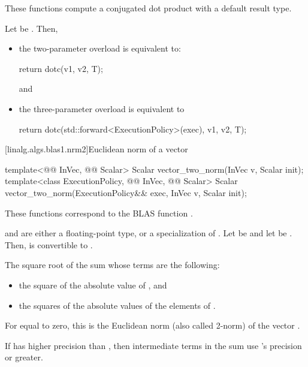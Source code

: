 \begin{itemdescr}

\pnum
These functions compute a conjugated dot product with a default result type.

\pnum
\effects
Let  be .
Then,
\begin{itemize}
\item
the two-parameter overload is equivalent to:
\begin{codeblock}
return dotc(v1, v2, T{});
\end{codeblock}
and
\item
the three-parameter overload is equivalent to
\begin{codeblock}
return dotc(std::forward<ExecutionPolicy>(exec), v1, v2, T{});
\end{codeblock}
\end{itemize}
\end{itemdescr}

[linalg.algs.blas1.nrm2]{Euclidean norm of a vector}

%
\begin{itemdecl}
template<@@ InVec, @@ Scalar>
  Scalar vector_two_norm(InVec v, Scalar init);
template<class ExecutionPolicy, @@ InVec, @@ Scalar>
  Scalar vector_two_norm(ExecutionPolicy&& exec, InVec v, Scalar init);
\end{itemdecl}

\begin{itemdescr}
\pnum
\begin{note}
These functions correspond to the BLAS function \supercite{blas1}.
\end{note}

\pnum
\mandates
{} and  are either a floating-point type, or
a specialization of .
Let  be
 and
let  be .
Then, 
is convertible to .

\pnum
\returns
The square root of the sum
whose terms are the following:
\begin{itemize}
\item
the square of the absolute value of , and
\item
the squares of the absolute values of the elements of .
\end{itemize}
\begin{note}
For  equal to zero, this is the Euclidean norm
(also called 2-norm) of the vector .
\end{note}

\pnum
\remarks
If  has higher precision
than ,
then intermediate terms in the sum use 's precision or greater.
\end{itemdescr}

